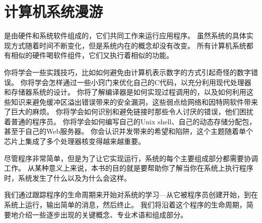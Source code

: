 \chapter{计算机系统漫游}
{
    是由硬件和系统软件组成的，它们共同工作来运行应用程序。
    虽然系统的具体实现方式随着时间不断变化，但是系统内在的概念却没有改变。
    所有计算机系统都有相似的硬件喝软件组件，它们又执行着相似的功能。

    你将学会一些实践技巧，比如如何避免由计算机表示数字的方式引起奇怪的数字错误。
    你将学会怎样通过一些小窍门来优化自己的C代码，以充分利用现代处理器和存储器系统的设计。
    你将了解编译器是如何实现过程调用的，以及如何利用这些知识来避免缓冲区溢出错误带来的安全漏洞，这些弱点给网络和因特网软件带来了巨大的麻烦。
    你将学会如何识别和避免链接时那些令人讨厌的错误，他们困扰着普通的程序员。
    你将学会如何编写自己的Unix shell、自己的动态存储分配包，甚至于自己的Web服务器。
    你会认识并发带来的希望和陷阱，这个主题随着单个芯片上集成了多个处理器核变得越来越重要。

    尽管程序非常简单，但是为了让它实现运行，系统的每个主要组成部分都需要协调工作。
    从某种意义上来说，本书的目的就是要帮助你了解当你在系统上执行程序时，系统发生了什么以及为什么会这样。

    \begin{codelist}
        
    \end{codelist}

    我们通过跟踪程序的生命周期来开始对系统的学习---从它被程序员创建开始，到在系统上运行，输出简单的消息，然后终止。
    我们将沿着这个程序的生命周期，简要地介绍一些逐步出现的关键概念、专业术语和组成部分。

    
    
    
    
    
    
    
    
    
    
}

\cleardoublepage

\endinput
